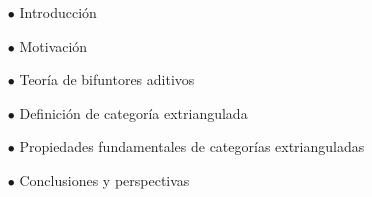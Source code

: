 \documentclass[preview]{standalone}
\begin{document}
\begin{center}
\begin{itemize}
                        \item[$\bullet$] Introducción
                        \item[$\bullet$] Motivación
                        \item[$\bullet$] Teoría de bifuntores aditivos
                        \item[$\bullet$] Definición de categoría extriangulada
                        \item[$\bullet$] Propiedades fundamentales de categorías extrianguladas
                        \item[$\bullet$] Conclusiones y perspectivas
                    \end{itemize}
\end{center}
\end{document}

